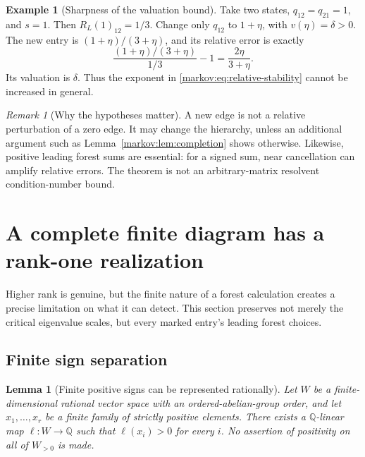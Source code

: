 \documentclass[11pt]{article}
\numberwithin{equation}{section}
\newtheorem{lemma}[theorem]{Lemma}
\theoremstyle{definition}
\newtheorem{example}[theorem]{Example}
\theoremstyle{remark}
\newtheorem{remark}[theorem]{Remark}
\newcommand{\Q}{\mathbb Q}
\begin{document}
\begin{example}[Sharpness of the valuation bound]\label{markov:ex:sharp}
Take two states, $q_{12}=q_{21}=1$, and $s=1$. Then $R_L(1)_{12}=1/3$.
Change only $q_{12}$ to $1+\eta$, with $v(\eta)=\delta>0$. The new entry is
$(1+\eta)/(3+\eta)$, and its relative error is exactly
\[
 \frac{(1+\eta)/(3+\eta)}{1/3}-1=\frac{2\eta}{3+\eta}.
\]
Its valuation is $\delta$. Thus the exponent in
\eqref{markov:eq:relative-stability} cannot be increased in general.
\end{example}

\begin{remark}[Why the hypotheses matter]\label{markov:rem:hypotheses}
A new edge is not a relative perturbation of a zero edge. It may change the
hierarchy, unless an additional argument such as Lemma~\ref{markov:lem:completion}
shows otherwise. Likewise, positive leading forest sums are essential: for a
signed sum, near cancellation can amplify relative errors. The theorem is not
an arbitrary-matrix resolvent condition-number bound.
\end{remark}

\section{A complete finite diagram has a rank-one realization}\label{markov:sec:specialization}

Higher rank is genuine, but the finite nature of a forest calculation creates a
precise limitation on what it can detect. This section preserves not merely the
critical eigenvalue scales, but every marked entry's leading forest choices.

\subsection{Finite sign separation}

\begin{lemma}[Finite positive signs can be represented rationally]\label{markov:lem:separation}
Let $W$ be a finite-dimensional rational vector space with an ordered-abelian-group
order, and let $x_1,\ldots,x_r$ be a finite family of strictly positive elements.
There exists a $\Q$-linear map $\ell:W\to\Q$ such that $\ell(x_i)>0$ for every
$i$. No assertion of positivity on all of $W_{>0}$ is made.
\end{lemma}
\end{document}
